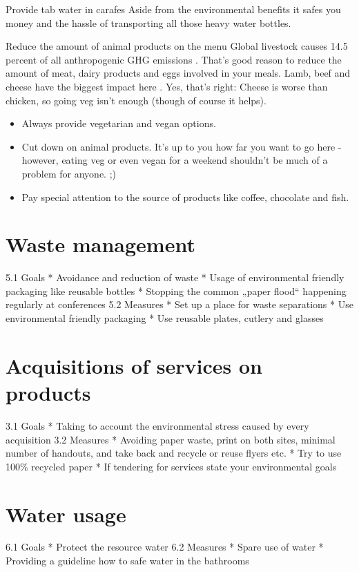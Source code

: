 \begin{suggest}{Provide tab water in carafes}
	Aside from the environmental benefits it safes you money and the hassle of transporting all those heavy water bottles.
\end{suggest}

\begin{suggest}{Reduce the amount of animal products on the menu}
	Global livestock causes 14.5 percent of all anthropogenic GHG emissions \cite{livestock}. That's good reason to reduce the amount of meat, dairy products and eggs involved in your meals. Lamb, beef and cheese have the biggest impact here \cite{animalGHG}. Yes, that's right: Cheese is worse than chicken, so going veg isn't enough (though of course it helps).
	\begin{itemize}
		\item Always provide vegetarian and vegan options.
		\item Cut down on animal products. It's up to you how far you want to go here - however, eating veg or even vegan for a weekend shouldn't be much of a problem for anyone. ;)
		\item Pay special attention to the source of products like coffee, chocolate and fish.
	\end{itemize}
\end{suggest}

\section{Waste management} 
5.1 Goals
*	Avoidance and reduction of waste
*	Usage of environmental friendly packaging like reusable bottles
*	Stopping the common „paper flood“ happening regularly at conferences 
5.2 Measures
*	Set up a place for waste separations 
*	Use environmental friendly packaging
*	Use reusable plates, cutlery and glasses

\section{Acquisitions of services on products}
3.1 Goals 
*	Taking to account the environmental stress caused by every acquisition 
3.2 Measures
*	Avoiding paper waste, print on both sites, minimal number of handouts, and take back and recycle or reuse flyers etc.
*	Try to use 100\% recycled paper
*	If tendering for services state your environmental goals

\section{Water usage}
6.1 Goals
*	Protect the resource water
6.2 Measures
*	Spare use of water
*	Providing a guideline how to safe water in the bathrooms

